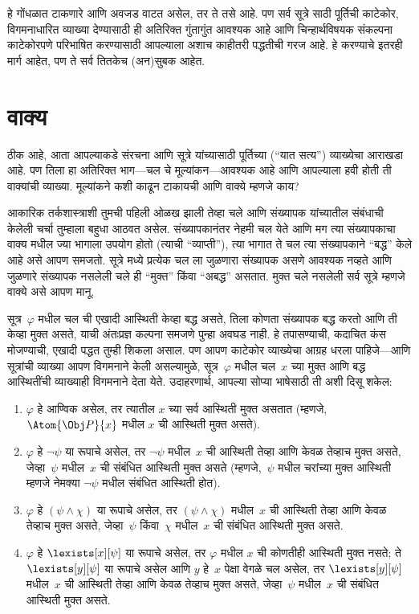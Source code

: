 हे गोंधळात टाकणारे आणि अवजड वाटत असेल, तर ते तसे आहे. पण सर्व
सूत्रे साठी पूर्तिची काटेकोर, विगमनाधारित व्याख्या देण्यासाठी ही
अतिरिक्त गुंतागुंत आवश्यक आहे आणि चिन्हार्थविषयक संकल्पना काटेकोरपणे
परिभाषित करण्यासाठी आपल्याला अशाच काहीतरी पद्धतीची गरज आहे. हे
करण्याचे इतरही मार्ग आहेत, पण ते सर्व तितकेच (अन)सुबक आहेत.












\section{वाक्य}\label{fol:int:snt:sec}

ठीक आहे, आता आपल्याकडे संरचना आणि सूत्रे यांच्यासाठी
पूर्तिच्या (``यात सत्य'') व्याख्येचा आराखडा आहे. पण तिला हा अतिरिक्त
भाग---चल चे मूल्यांकन---आवश्यक आहे आणि आपल्याला हवी होती ती
वाक्यांची व्याख्या. मूल्यांकने कशी काढून टाकायची आणि
वाक्ये म्हणजे काय?

आकारिक तर्कशास्त्राशी तुमची पहिली ओळख झाली तेव्हा चले आणि
संख्यापक यांच्यातील संबंधाची केलेली चर्चा तुम्हाला बहुधा आठवत असेल.
संख्यापकानंतर नेहमी चल येते आणि मग त्या संख्यापकाचा
वाक्य मधील ज्या भागाला उपयोग होतो (त्याची ``व्याप्ती''), त्या
भागात ते चल त्या संख्यापकाने ``बद्ध'' केले आहे असे आपण
समजतो. सूत्रे मध्ये प्रत्येक चल ला जुळणारा संख्यापक
असणे आवश्यक नव्हते आणि जुळणारे संख्यापक नसलेली चले ही
``मुक्त'' किंवा ``अबद्ध'' असतात. मुक्त चले नसलेली सर्व
सूत्रे म्हणजे वाक्ये असे आपण मानू.

सूत्र~$\varphi$ मधील चल ची एखादी आस्थिती केव्हा बद्ध असते,
तिला कोणता संख्यापक बद्ध करतो आणि ती केव्हा मुक्त असते, याची अंतःप्रज्ञ
कल्पना समजणे पुन्हा अवघड नाही. हे तपासण्याची, कदाचित कंस मोजण्याची,
एखादी पद्धत तुम्ही शिकला असाल. पण आपण काटेकोर व्याख्येचा आग्रह धरला
पाहिजे---आणि सूत्रांची व्याख्या आपण विगमनाने केली असल्यामुळे,
सूत्र~$\varphi$ मधील चल~$x$ च्या मुक्त आणि बद्ध आस्थितींची
व्याख्याही विगमनाने देता येते. उदाहरणार्थ, आपल्या सोप्या भाषेसाठी ती
अशी दिसू शकेल:
\begin{enumerate}
  \item $\varphi$ हे आण्विक असेल, तर त्यातील $x$ च्या सर्व आस्थिती मुक्त
  असतात (म्हणजे, $\Atom{\Obj P}{x}$ मधील $x$ ची आस्थिती मुक्त असते).
  \item $\varphi$ हे $\lnot \psi$ या रूपाचे असेल, तर $\lnot \psi$ मधील~$x$ ची
  आस्थिती तेव्हा आणि केवळ तेव्हाच मुक्त असते, जेव्हा~$\psi$ मधील~$x$ ची
  संबंधित आस्थिती मुक्त असते (म्हणजे,~$\psi$ मधील चरांच्या मुक्त
  आस्थिती म्हणजे नेमक्या $\lnot \psi$ मधील संबंधित आस्थिती होत).
  \item $\varphi$ हे $(\psi \land \chi)$ या रूपाचे असेल, तर $(\psi \land \chi)$
  मधील~$x$ ची आस्थिती तेव्हा आणि केवळ तेव्हाच मुक्त असते, जेव्हा~$\psi$
  किंवा~$\chi$ मधील~$x$ ची संबंधित आस्थिती मुक्त असते.
  \item $\varphi$ हे $\lexists[x][\psi]$ या रूपाचे असेल, तर $\varphi$ मधील $x$ ची
  कोणतीही आस्थिती मुक्त नसते; ते $\lexists[y][\psi]$ या रूपाचे असेल आणि
  $y$ हे~$x$ पेक्षा वेगळे चल असेल, तर
  $\lexists[y][\psi]$ मधील~$x$ ची आस्थिती तेव्हा आणि केवळ तेव्हाच मुक्त
  असते, जेव्हा~$\psi$ मधील~$x$ ची संबंधित आस्थिती मुक्त असते.
\end{enumerate}

